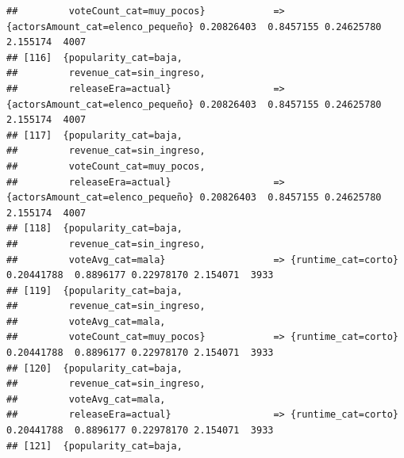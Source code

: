 \documentclass[
]{article}
\begin{document}
\begin{verbatim}
##         voteCount_cat=muy_pocos}            => {actorsAmount_cat=elenco_pequeño} 0.20826403  0.8457155 0.24625780 2.155174  4007
## [116]  {popularity_cat=baja,                                                                                                    
##         revenue_cat=sin_ingreso,                                                                                                
##         releaseEra=actual}                  => {actorsAmount_cat=elenco_pequeño} 0.20826403  0.8457155 0.24625780 2.155174  4007
## [117]  {popularity_cat=baja,                                                                                                    
##         revenue_cat=sin_ingreso,                                                                                                
##         voteCount_cat=muy_pocos,                                                                                                
##         releaseEra=actual}                  => {actorsAmount_cat=elenco_pequeño} 0.20826403  0.8457155 0.24625780 2.155174  4007
## [118]  {popularity_cat=baja,                                                                                                    
##         revenue_cat=sin_ingreso,                                                                                                
##         voteAvg_cat=mala}                   => {runtime_cat=corto}               0.20441788  0.8896177 0.22978170 2.154071  3933
## [119]  {popularity_cat=baja,                                                                                                    
##         revenue_cat=sin_ingreso,                                                                                                
##         voteAvg_cat=mala,                                                                                                       
##         voteCount_cat=muy_pocos}            => {runtime_cat=corto}               0.20441788  0.8896177 0.22978170 2.154071  3933
## [120]  {popularity_cat=baja,                                                                                                    
##         revenue_cat=sin_ingreso,                                                                                                
##         voteAvg_cat=mala,                                                                                                       
##         releaseEra=actual}                  => {runtime_cat=corto}               0.20441788  0.8896177 0.22978170 2.154071  3933
## [121]  {popularity_cat=baja,                                                                                                    

\end{verbatim}
\end{document}
